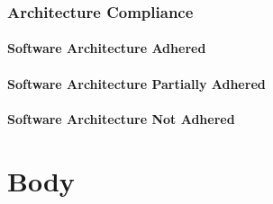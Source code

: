 \documentclass{article}
\begin{document}
\subsubsection{Architecture Compliance}
\paragraph{Software Architecture Adhered}
\paragraph{Software Architecture Partially Adhered}
\paragraph{Software Architecture Not Adhered}

\newpage
\section{Body}
\lipsum[1]
\end{document}
